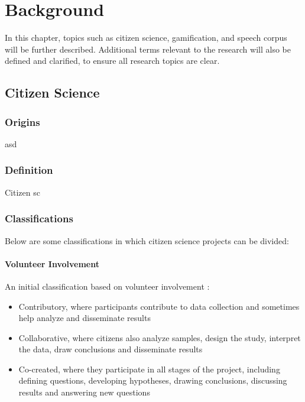 \chapter{Background}

In this chapter, topics such as citizen science, gamification, and speech corpus will be further described. Additional terms relevant to the research will also be defined and clarified, to ensure all research topics are clear. 

\section{Citizen Science}



\subsection{Origins}
asd
\subsection{Definition}

Citizen sc

\subsection{Classifications}

Below are some classifications in which citizen science projects can be divided:

\subsubsection{Volunteer Involvement}

An initial classification based on volunteer involvement \cite{follett2015analysis}: 
\begin{itemize}
    \item Contributory, where participants contribute to data collection and sometimes help analyze and disseminate results
    \item Collaborative, where citizens also analyze samples, design the study, interpret the data, draw conclusions and disseminate results
    \item Co-created, where they participate in all stages of the project, including defining questions, developing hypotheses, drawing conclusions, discussing results and answering new questions
\end{itemize}

